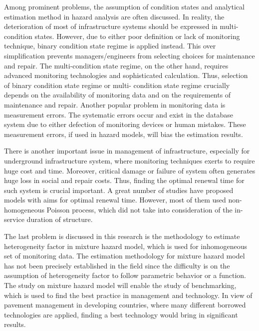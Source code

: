 Among prominent problems, the assumption of condition states and analytical estimation method in hazard analysis are often discussed. In reality, the deterioration of most of infrastructure systems should be expressed in multi-condition states. However, due to either poor definition or lack of monitoring technique, binary condition state regime is applied instead. This over simplification prevents managers/engineers from selecting choices for maintenance and repair. The multi-condition state regime, on the other hand, requires advanced monitoring technologies and sophisticated calculation. Thus, selection of binary condition state regime or multi- condition state regime crucially depends on the availability of monitoring data and on the requirements of maintenance and repair. Another popular problem in monitoring data is measurement errors. The systematic errors occur and exist in the database system due to either defection of monitoring devices or human mistakes. These measurement errors, if used in hazard models, will bias the estimation results. 

There is another important issue in management of infrastructure, especially for underground infrastructure system, where monitoring techniques exerts to require huge cost and time. Moreover, critical damage or failure of system often generates huge loss in social and repair costs. Thus, finding the optimal renewal time for such system is crucial important. A great number of studies have proposed models with aims for optimal renewal time. However, most of them used non-homogeneous Poisson process, which did not take into consideration of the in-service duration of structure. 

The last problem is discussed in this research is the methodology to estimate heterogeneity factor in mixture hazard model, which is used for inhomogeneous set of monitoring data. The estimation methodology for mixture hazard model has not been precisely established in the field since the difficulty is on the assumption of heterogeneity factor to follow parametric behavior or a function. The study on mixture hazard model will enable the study of benchmarking, which is used to find the best practice in management and technology. In view of pavement management in developing countries, where many different borrowed technologies are applied, finding a best technology would bring in significant results.

